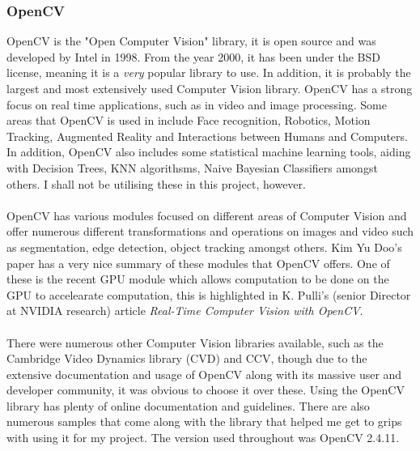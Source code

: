 \documentclass[11pt]{article}
\begin{document}
\subsubsection{OpenCV}
OpenCV is the "Open Computer Vision" library, it is open source and was
developed by Intel in 1998. From the year 2000, it has been under the BSD
license, meaning it is a \textit{very} popular library to use. In addition,
it is probably the largest and most extensively used Computer Vision library.
OpenCV has a strong focus on real time applications, such as in video and
image processing. Some areas that
OpenCV is used in include Face recognition, Robotics, Motion Tracking, 
Augmented Reality and Interactions between Humans and Computers. In addition,
OpenCV also includes some statistical machine learning tools, aiding with
Decision Trees, KNN algorithsms, Naive Bayesian Classifiers amongst others. 
I shall not be utilising these in this project, however.\\
\\
OpenCV has various modules focused on different areas of
Computer Vision and offer numerous different transformations and operations
on images and video such as segmentation, edge detection, object tracking
amongst others. Kim Yu Doo's paper\cite{Kim14} has a very nice summary of
these modules that OpenCV offers. One of these is the recent GPU module which
allows computation to be done on the GPU to accelearate computation, this is
highlighted in K. Pulli's (senior Director at NVIDIA research) article  
\textit{Real-Time Computer Vision with OpenCV}\cite{Pulli12}.\\
\\
There were numerous other Computer Vision libraries available, such as 
the Cambridge Video Dynamics library (CVD) and CCV, though due to the extensive
documentation and usage of OpenCV along with its massive user and developer
community, it was obvious to choose it over these. 
Using the OpenCV library has plenty
of online documentation and guidelines. There are also numerous samples
that come along with the library that helped me get to grips with using it 
for my project. The version used throughout was OpenCV 2.4.11.
\end{document}
